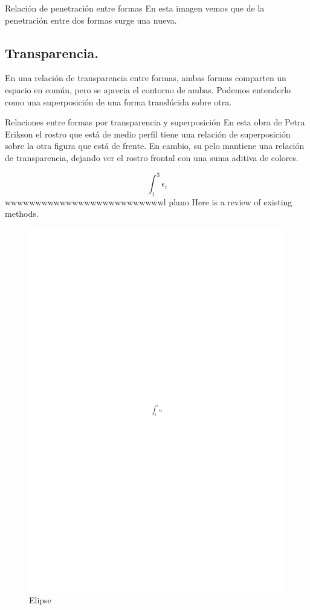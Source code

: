 \documentclass[16pt,]{krantz}
\theoremstyle{definition}
\theoremstyle{definition}
\theoremstyle{definition}
\theoremstyle{definition}
\theoremstyle{remark}
\begin{document}
Relación de penetración entre formas
En esta imagen vemos que de la penetración entre dos formas surge una nueva.

\hypertarget{transparencia.}{%
\subsection{Transparencia.}\label{transparencia.}}

En una relación de transparencia entre formas, ambas formas comparten un espacio en común, pero se aprecia el contorno de ambas. Podemos entenderlo como una superposición de una forma translúcida sobre otra.

Relaciones entre formas por transparencia y superposición
En esta obra de Petra Erikson el rostro que está de medio perfil tiene una relación de superposición sobre la otra figura que está de frente. En cambio, su pelo mantiene una relación de transparencia, dejando ver el rostro frontal con una suma aditiva de colores.

\[\int_1^3\epsilon_i\]
wwwwwwwwwwwwwwwwwwwwwwwwwwl plano Here is a review of existing methods.

\begin{figure}[!ht]

{\centering \includegraphics{dibujo} 

}

\caption{Elipse}\label{fig:pressure1}
\end{figure}
\end{document}
